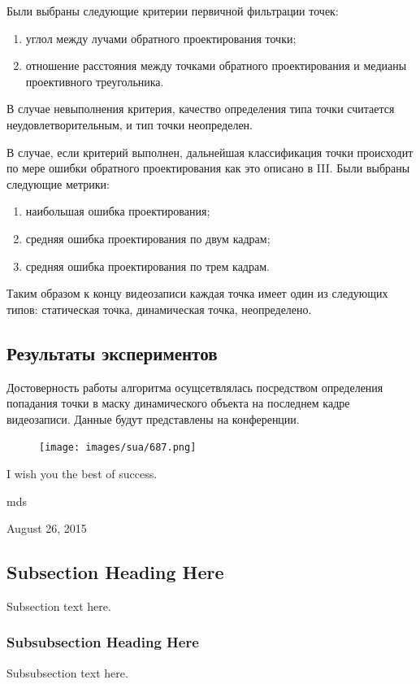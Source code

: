 \documentclass[conference]{IEEEtran}
\begin{document}
Были выбраны следующие критерии первичной фильтрации точек:
\begin{enumerate}
\item углол между лучами обратного проектирования точки;
\item отношение расстояния между точками обратного проектирования и медианы проективного треугольника.
\end{enumerate}
В случае невыполнения критерия, качество определения типа точки считается неудовлетворительным, и тип точки неопределен.

В случае, если критерий выполнен, дальнейшая классификация точки происходит по мере ошибки обратного проектирования как это описано в III. Были выбраны следующие метрики:
\begin{enumerate}
\item наибольшая ошибка проектирования;
\item средняя ошибка проектирования по двум кадрам;
\item средняя ошибка проектирования по трем кадрам.
\end{enumerate}

Таким образом к концу видеозаписи каждая точка имеет один из следующих типов: статическая точка, динамическая точка, неопределено. 

\subsection{Результаты экспериментов}
Достоверность работы алгоритма осущсетвлялась посредством определения попадания точки в маску динамического объекта на последнем кадре видеозаписи. Данные будут представлены на конференции.
\begin{figure}[h]
	\centering
		\texttt{[image: images/sua/687.png]}
	\label{fig:000757}
\end{figure}

I wish you the best of success.

\hfill mds
 
\hfill August 26, 2015

\subsection{Subsection Heading Here}
Subsection text here.


\subsubsection{Subsubsection Heading Here}
Subsubsection text here.
\end{document}
